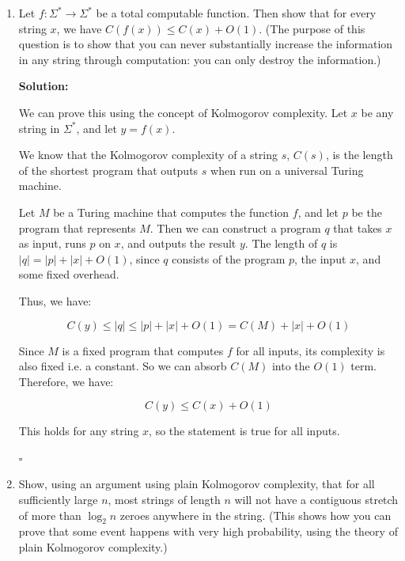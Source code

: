 \documentclass[10pt]{article}
\newenvironment{solution}{\textbf{Solution:}}{\hfill$\square$}
\begin{document}
\begin{enumerate}
\begin{solution}
    Therefore, we have shown that for any sufficiently large $n$, the Kolmogorov complexity of the first $n$ bits of $\omega$ is at least $n-O(1)$. Hence, prefixes of $\omega$ are incompressible.
        
    \end{solution}
    \newpage

    \item Let $f : \Sigma^*\rightarrow \Sigma^*$ be a total computable function. Then show that for every string $x$, we have $C(f(x)) \leq C(x) + O(1)$. (The purpose of this question is to show that you can never substantially increase the information in any string through computation: you can only destroy the information.)

    \begin{solution}

    We can prove this using the concept of Kolmogorov complexity. Let $x$ be any string in $\Sigma^*$, and let $y = f(x)$.
    
    We know that the Kolmogorov complexity of a string $s$, $C(s)$, is the length of the shortest program that outputs $s$ when run on a universal Turing machine.
    
    Let $M$ be a Turing machine that computes the function $f$, and let $p$ be the program that represents $M$. Then we can construct a program $q$ that takes $x$ as input, runs $p$ on $x$, and outputs the result $y$. The length of $q$ is $|q| = |p| + |x| + O(1)$, since $q$ consists of the program $p$, the input $x$, and some fixed overhead.

Thus, we have:

$$C(y) \leq |q| \leq |p| + |x| + O(1) = C(M) + |x| + O(1)$$

Since $M$ is a fixed program that computes $f$ for all inputs, its complexity is also fixed i.e. a constant. So we can absorb $C(M)$ into the $O(1)$ term. Therefore, we have:

$$C(y) \leq C(x) + O(1)$$

This holds for any string $x$, so the statement is true for all inputs.


        
    \end{solution}
    \newpage

    \item Show, using an argument using plain Kolmogorov complexity, that for all sufficiently large $n$, most strings of length $n$ will not have a contiguous stretch of more than $\log_2 n$ zeroes anywhere in the string. (This shows how you can prove that some event happens with very high probability, using the theory of plain Kolmogorov complexity.)


\end{enumerate}
\end{document}
